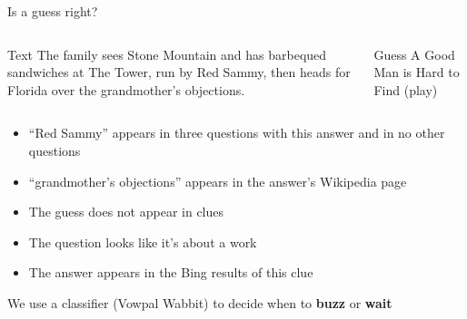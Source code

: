 \documentclass[compress]{beamer}
\begin{document}
\begin{frame}{Is a guess right?}

	\begin{columns}
	\begin{block}{Text}
	The family sees Stone Mountain and has barbequed sandwiches at The Tower, run by Red Sammy, then heads for Florida over the grandmother's objections.
	\end{block}
	\begin{block}{Guess}
	A Good Man is Hard to Find (play)
	\end{block}
	\end{columns}
	
	\begin{itemize}
		\item ``Red Sammy'' appears in three questions with this answer and in no other questions
		\item ``grandmother's objections'' appears in the answer's Wikipedia page
		\item The guess does not appear in clues
		\item The question looks like it's about a work
		\item The answer appears in the Bing results of this clue
	\end{itemize}
	
	\pause
	
	We use a classifier (Vowpal Wabbit) to decide when to {\bf buzz} or {\bf wait}

\end{frame}
\end{document}
